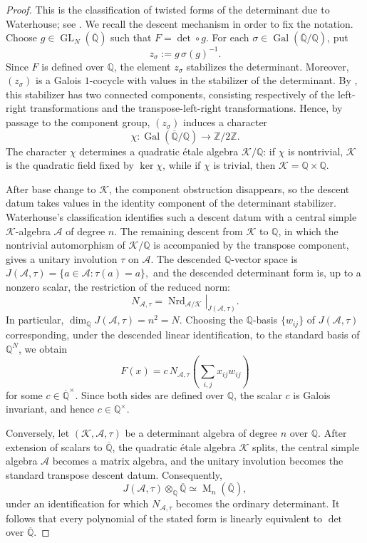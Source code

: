 \documentclass[reqno,11pt]{amsart}
\numberwithin{equation}{section}
\theoremstyle{definition}
\theoremstyle{remark}
\newcommand{\op}{\operatorname}
\newcommand{\M}{\op{M}}
\newcommand{\GL}{\op{GL}}
\begin{document}
\begin{proof}
This is the classification of twisted forms of the determinant due to
Waterhouse; see \cite{WaterhouseTwistedDeterminant}. We recall the descent
mechanism in order to fix the notation.
Choose $g\in\GL_N(\overline{\mathbb Q})$ such that
$F=\det\circ g$.
For each $\sigma\in\operatorname{Gal}(\overline{\mathbb Q}/\mathbb Q)$,
put
$$
z_\sigma:=g\,\sigma(g)^{-1}.
$$
Since $F$ is defined over $\mathbb Q$, the element $z_\sigma$ stabilizes
the determinant. Moreover, $(z_\sigma)$ is a Galois $1$-cocycle with
values in the stabilizer of the determinant. By , this
stabilizer has two connected components, consisting respectively of the
left-right transformations and the transpose-left-right transformations.
Hence, by passage to the component group, $(z_\sigma)$ induces a character
$$
\chi:\operatorname{Gal}(\overline{\mathbb Q}/\mathbb Q)
\to\mathbb Z/2\mathbb Z.
$$
The character $\chi$ determines a quadratic \'etale algebra
$\mathscr K/\mathbb Q$: if $\chi$ is nontrivial, $\mathscr K$ is the
quadratic field fixed by $\ker\chi$, while if $\chi$ is trivial, then
$\mathscr K=\mathbb Q\times\mathbb Q$.

After base change to $\mathscr K$, the component obstruction disappears,
so the descent datum takes values in the identity component of the determinant
stabilizer. Waterhouse's classification identifies such a descent datum
with a central simple $\mathscr K$-algebra $\mathscr A$ of degree $n$.
The remaining descent from $\mathscr K$ to $\mathbb Q$, in which the
nontrivial automorphism of $\mathscr K/\mathbb Q$ is accompanied by the
transpose component, gives a unitary involution $\tau$ on $\mathscr A$.
The descended $\mathbb Q$-vector space is
$
J(\mathscr A,\tau)
=
\{a\in\mathscr A:\tau(a)=a\},
$
and the descended determinant form is, up to a nonzero scalar, the
restriction of the reduced norm:
$$
N_{\mathscr A,\tau}
=
\left.
\operatorname{Nrd}_{\mathscr A/\mathscr K}
\right|_{J(\mathscr A,\tau)}.
$$
In particular, $\dim_{\mathbb Q}J(\mathscr A,\tau)=n^2=N$. Choosing the
$\mathbb Q$-basis $\{w_{ij}\}$ of $J(\mathscr A,\tau)$ corresponding,
under the descended linear identification, to the standard basis of
$\mathbb Q^N$, we obtain
$$
F(x)
=
c\,N_{\mathscr A,\tau}
\left(\sum_{i,j}x_{ij}w_{ij}\right)
$$
for some $c\in\overline{\mathbb Q}^{\times}$. Since both sides are defined
over $\mathbb Q$, the scalar $c$ is Galois invariant, and hence
$c\in\mathbb Q^\times$.

Conversely, let $(\mathscr K,\mathscr A,\tau)$ be a determinant algebra
of degree $n$ over $\mathbb Q$. After extension of scalars to
$\overline{\mathbb Q}$, the quadratic \'etale algebra $\mathscr K$ splits,
the central simple algebra $\mathscr A$ becomes a matrix algebra, and the
unitary involution becomes the standard transpose descent datum. Consequently,
$$
J(\mathscr A,\tau)\otimes_{\mathbb Q}\overline{\mathbb Q}
\simeq
\M_n(\overline{\mathbb Q}),
$$
under an identification for which $N_{\mathscr A,\tau}$ becomes the
ordinary determinant. It follows that every polynomial of the stated form
is linearly equivalent to $\det$ over $\overline{\mathbb Q}$.


\end{proof}
\end{document}
